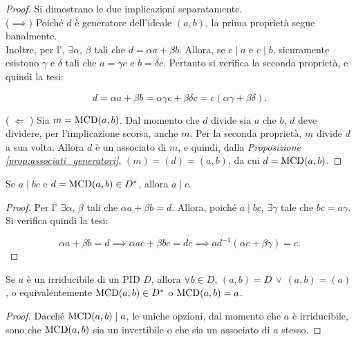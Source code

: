 \begin{proof} Si dimostrano le due implicazioni separatamente. \\

    ($\implies$) Poiché $d$ è generatore dell'ideale $(a, b)$, la prima proprietà segue banalmente. \\

    Inoltre, per l', $\exists \alpha$, $\beta$ tali che
    $d = \alpha a + \beta b$. Allora, se $c \mid a$ e $c \mid b$, sicuramente
    esistono $\gamma$ e $\delta$ tali che $a=\gamma c$ e $b=\delta c$. Pertanto
    si verifica la seconda proprietà, e quindi la tesi:

    \[ d = \alpha a + \beta b = \alpha \gamma c + \beta \delta c = c(\alpha\gamma+\beta\delta). \]

    \vskip 0.1in

    ($\;\Longleftarrow\;$) Sia $m = \operatorname{MCD}(a,b)$. Dal momento che $d$ divide
    sia $a$ che $b$, $d$ deve dividere, per l'implicazione scorsa, anche $m$.
    Per la seconda proprietà, $m$ divide $d$ a sua volta. Allora $d$ è un
    associato di $m$, e quindi, dalla \textit{Proposizione \ref{prop:associati_generatori}}, $(m)=(d)=(a,b)$, da cui $d = \operatorname{MCD}(a,b)$.
\end{proof}

\begin{proposition}
    \label{prop:divisione_gcd}
    Se $a \mid bc$ e $d = \operatorname{MCD}(a, b) \in D^*$, allora $a \mid c$.
\end{proposition}

\begin{proof}
    Per l' $\exists \alpha$, $\beta$ tali che
    $\alpha a + \beta b = d$. Allora, poiché $a \mid bc$, $\exists
        \gamma$ tale che $bc=a\gamma$. Si verifica quindi la tesi:

    \[ \alpha a + \beta b = d \implies \alpha ac + \beta bc = dc \implies
        a d^{-1} (\alpha c + \beta \gamma) = c.\]
\end{proof}

\begin{lemma}
    \label{lem:primalità_mcd}
    Se $a$ è un irriducibile di un PID $D$, allora $\forall b \in D$,
    $(a,b)=D \,\lor\, (a,b)=(a)$, o equivalentemente $\operatorname{MCD}(a,b) \in D^*$ o
    $\operatorname{MCD}(a,b) = a$.
\end{lemma}

\begin{proof}
    Dacché $\operatorname{MCD}(a,b) \mid a$, le uniche opzioni, dal momento che $a$ è irriducibile,
    sono che $\operatorname{MCD}(a,b)$ sia un invertibile o che sia un associato
    di $a$ stesso.
\end{proof}

